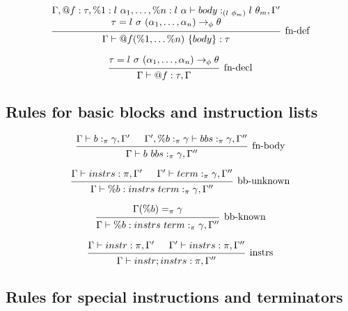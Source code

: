 \documentclass{article}
\begin{document}
\[
\begin{prooftree}
    \hypo{
    \begin{matrix}
        \Gamma, @f : \tau, \%1 : l\ \alpha_1, \ldots, \%n: l\ \alpha \vdash body :_{(l\ \phi_m)} l\ \theta_m, \Gamma' \\
        \tau = l\ \sigma\ (\alpha_1, \dots, \alpha_n) \rightarrow_\phi \theta
    \end{matrix}
    }
    \infer1[fn-def]{\Gamma \vdash @f(\%1, \dots \%n)\ \{ body \} : \tau}
    
\end{prooftree}
\]

\[
\begin{prooftree}
    \hypo{\tau = l\ \sigma\ (\alpha_1, \dots, \alpha_n) \rightarrow_\phi \theta}
    \infer1[fn-decl]{\Gamma \vdash @f : \tau, \Gamma}
\end{prooftree}
\]

\subsection{Rules for basic blocks and instruction lists}

\[
\begin{prooftree} 
    \hypo{\Gamma \vdash b :_\pi \gamma, \Gamma'}
    \hypo{\Gamma', \%b :_\pi \gamma \vdash bbs :_\pi \gamma, \Gamma''}
    \infer2[fn-body]{\Gamma \vdash b\ bbs :_\pi \gamma, \Gamma''}
\end{prooftree} 
\]


\[
\begin{prooftree} 
    \hypo{\Gamma \vdash instrs : \pi, \Gamma'}
    \hypo{\Gamma' \vdash term :_\pi \gamma, \Gamma''}
    \infer2[bb-unknown]{\Gamma \vdash \%b: instrs\ term :_\pi \gamma, \Gamma''}
\end{prooftree} 
\]


\[
\begin{prooftree} 
    \hypo{\Gamma(\%b) =_\pi \gamma} 
    \infer1[bb-known]{\Gamma \vdash \%b: instrs\ term :_\pi \gamma, \Gamma''}
\end{prooftree} 
\]


\[
\begin{prooftree} 
    \hypo{\Gamma \vdash instr : \pi, \Gamma'}
    \hypo{\Gamma' \vdash instrs : \pi, \Gamma''}
    \infer2[instrs]{\Gamma \vdash instr; instrs : \pi, \Gamma''}
\end{prooftree} 
\]

\subsection{Rules for special instructions and terminators}
\end{document}
